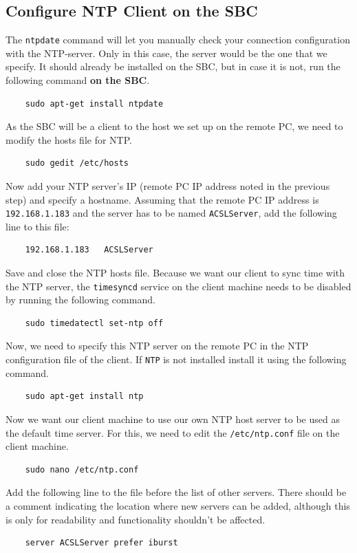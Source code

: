 \documentclass[12]{article}
\begin{document}
\subsection{Configure NTP Client on the SBC}
The \texttt{ntpdate} command will let you manually check your connection configuration with the NTP-server. Only in this case, the server would be the one that we specify. It should already be installed on the SBC, but in case it is not, run the following command \textbf{on the SBC}.
\begin{lstlisting}
    sudo apt-get install ntpdate
\end{lstlisting}
As the SBC will be a client to the host we set up on the remote PC, we need to modify the hosts file for NTP.
\begin{lstlisting}
    sudo gedit /etc/hosts
\end{lstlisting}
Now add your NTP server’s IP (remote PC IP address noted in the previous step) and specify a hostname. Assuming that the remote PC IP address is \texttt{192.168.1.183} and the server has to be named \texttt{ACSLServer}, add the following line to this file:
\begin{lstlisting}
    192.168.1.183	ACSLServer
\end{lstlisting}
Save and close the NTP hosts file. Because we want our client to sync time with the NTP server, the \texttt{timesyncd} service on the client machine needs to be disabled by running the following command.
\begin{lstlisting}
	sudo timedatectl set-ntp off
\end{lstlisting}
Now, we need to specify this NTP server on the remote PC in the NTP configuration file of the client. If \texttt{NTP} is not installed install it using the following command.
\begin{lstlisting}
	sudo apt-get install ntp
\end{lstlisting}
Now we want our client machine to use our own NTP host server to be used as the default time server. For this, we need to edit the \texttt{/etc/ntp.conf} file on the client machine.
\begin{lstlisting}
	sudo nano /etc/ntp.conf
\end{lstlisting}
Add the following line to the file before the list of other servers. There should be a comment indicating the location where new servers can be added, although this is only for readability and functionality shouldn't be affected.
\begin{lstlisting}
	server ACSLServer prefer iburst
\end{lstlisting}
\end{document}
